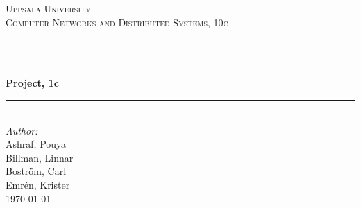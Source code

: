 \documentclass[12pt]{article}
\begin{document}

\begin{titlepage}

\newcommand{\HRule}{\rule{\linewidth}{0.5mm}} %

\begin{center}
\textsc{\LARGE Uppsala University}\\[1.5cm] %
\textsc{\Large Computer Networks and Distributed Systems, 10c}\\[0.5cm] %
\textsc{\large }\\[0.5cm] %

\HRule \\[0.4cm]
{ \huge \bfseries Project, 1c}\\[0.4cm] %
\HRule \\[1.5cm]
 

\large\emph{Author:}\\Ashraf, Pouya\\
					Billman, Linnar\\
					Boström, Carl\\
					Emrén, Krister\\[1.0cm]%




{\large \today}\\[2cm] %

\end{center}
\end{titlepage}
\pagebreak
\tableofcontents
\pagebreak
\end{document}

